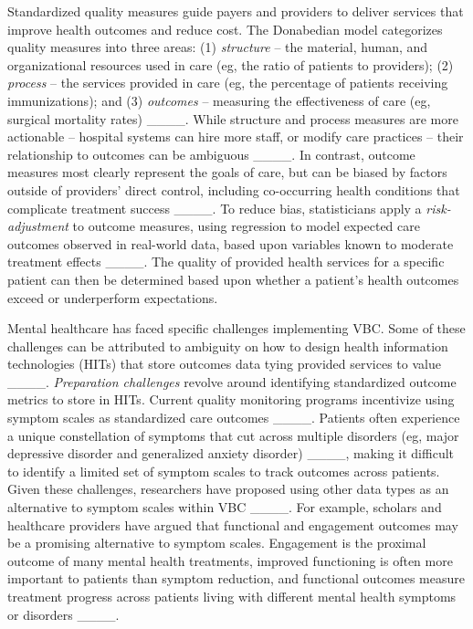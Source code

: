 Standardized quality measures guide payers and providers to deliver services that improve health outcomes and reduce cost.
The Donabedian model categorizes quality measures into three areas: (1) \textit{structure} -- the material, human, and organizational resources used in care (eg, the ratio of patients to providers); (2) \textit{process} -- the services provided in care (eg, the percentage of patients receiving immunizations); and (3) \textit{outcomes} -- measuring the effectiveness of care (eg, surgical mortality rates) ____.
While structure and process measures are more actionable -- hospital systems can hire more staff, or modify care practices -- their relationship to outcomes can be ambiguous ____. 
In contrast, outcome measures most clearly represent the goals of care, but can be biased by factors outside of providers' direct control, including co-occurring health conditions that complicate treatment success ____.
To reduce bias, statisticians apply a \textit{risk-adjustment} to outcome measures, using regression to model expected care outcomes observed in real-world data, based upon variables known to moderate treatment effects ____.
The quality of provided health services for a specific patient can then be determined based upon whether a patient's health outcomes exceed or underperform expectations.

Mental healthcare has faced specific challenges implementing VBC.
Some of these challenges can be attributed to ambiguity on how to design health information technologies (HITs) that store outcomes data tying provided services to value ____.
\textit{Preparation challenges} revolve around identifying standardized outcome metrics to store in HITs.
Current quality monitoring programs incentivize using symptom scales as standardized care outcomes ____.
Patients often experience a unique constellation of symptoms that cut across multiple disorders (eg, major depressive disorder and generalized anxiety disorder) ____, making it difficult to identify a limited set of symptom scales to track outcomes across patients.
Given these challenges, researchers have proposed using other data types as an alternative to symptom scales within VBC ____. 
For example, scholars and healthcare providers have argued that functional and engagement outcomes may be a promising alternative to symptom scales. 
Engagement is the proximal outcome of many mental health treatments, improved functioning is often more important to patients than symptom reduction, and functional outcomes measure treatment progress across patients living with different mental health symptoms or disorders ____.

